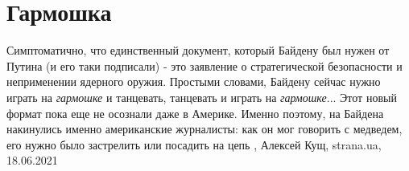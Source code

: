  
 
 
 
 
\chapter{Гармошка}

Симптоматично, что единственный документ, который Байдену был нужен от Путина
(и его таки подписали) - это заявление о стратегической безопасности и
неприменении ядерного оружия. Простыми словами, Байдену сейчас нужно играть на
\emph{гармошке} и танцевать, танцевать и играть на \emph{гармошке}...  Этот
новый формат пока еще не осознали даже в Америке. Именно поэтому, на Байдена
накинулись именно американские журналисты: как он мог говорить с медведем, его
нужно было застрелить или посадить на цепь
,
Алексей Кущ, strana.ua, 18.06.2021

